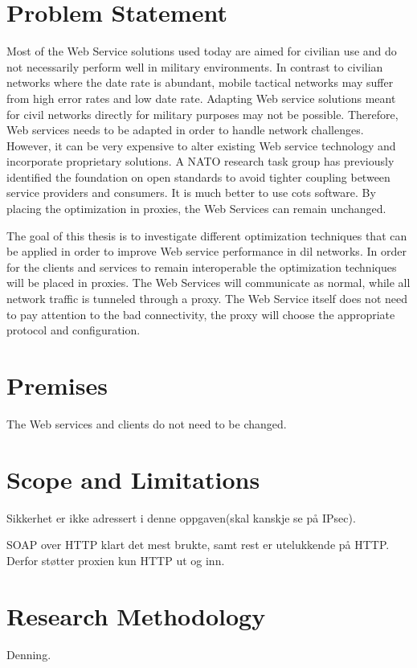 \documentclass[USenglish]{ifimaster}
\begin{document}
\section{Problem Statement}
Most of the Web Service solutions used today are aimed for civilian use and do
not necessarily perform well in military environments. In contrast to civilian
networks where the date rate is abundant, mobile tactical networks may suffer
from high error rates and low date rate. Adapting Web service solutions meant
for civil networks directly for military purposes may not be possible.
Therefore, Web services needs to be adapted in order to handle network
challenges. However, it can be very expensive to alter existing Web service
technology and incorporate proprietary solutions. A NATO research task group has
previously identified the foundation on open standards to avoid tighter coupling
between service providers and consumers\cite{ist-090}. It is much better to use
\gls{cots} software. By placing the optimization in proxies, the
Web Services can remain unchanged.

The goal of this thesis is to investigate different optimization techniques that
can be applied in order to improve Web service performance in \gls{dil}
networks. In order for the clients and services to remain interoperable the
optimization techniques will be placed in proxies. The Web Services will
communicate as normal, while all network traffic is tunneled through a proxy.
The Web Service itself does not need to pay attention to the bad connectivity,
the proxy will choose the appropriate protocol and configuration.

\section{Premises}
The Web services and clients do not need to be changed.

\section{Scope and Limitations}
Sikkerhet er ikke adressert i denne oppgaven(skal kanskje se på IPsec).

SOAP over HTTP klart det mest brukte, samt rest er utelukkende på HTTP. Derfor
støtter proxien kun HTTP ut og inn.

\section{Research Methodology}
Denning.
\end{document}
